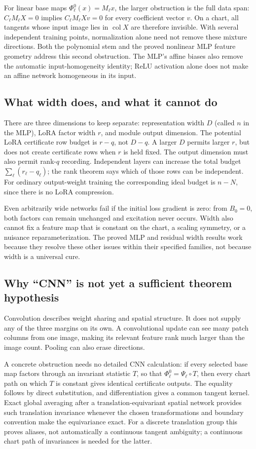 \documentclass[12pt,a4paper]{article}
\theoremstyle{readable}
\theoremstyle{definition}\newtheorem{example}[theorem]{Example}
\newcommand{\col}{\operatorname{col}}\newcommand{\row}{\operatorname{row}}
\begin{document}
For linear base maps \(\Phi_\ell^0(x)=M_\ell x\), the larger obstruction is the full data span: \(C_\ell M_\ell X=0\) implies \(C_\ell M_\ell Xv=0\) for every coefficient vector \(v\). On a chart, all tangents whose input image lies in \(\col X\) are therefore invisible. With several independent training points, normalization alone need not remove these mixture directions. Both the polynomial stem and the proved nonlinear MLP feature geometry address this second obstruction. The MLP's affine biases also remove the automatic input-homogeneity identity; ReLU activation alone does not make an affine network homogeneous in its input.

\subsection{What width does, and what it cannot do}
There are three dimensions to keep separate: representation width \(D\) (called \(n\) in the MLP), LoRA factor width \(r\), and module output dimension. The potential LoRA certificate row budget is \(r-q\), not \(D-q\). A larger \(D\) permits larger \(r\), but does not create certificate rows when \(r\) is held fixed. The output dimension must also permit rank-\(q\) recording. Independent layers can increase the total budget \(\sum_\ell(r_\ell-q_\ell)\); the rank theorem says which of those rows can be independent. For ordinary output-weight training the corresponding ideal budget is \(n-N\), since there is no LoRA compression.

Even arbitrarily wide networks fail if the initial loss gradient is zero: from \(B_0=0\), both factors can remain unchanged and excitation never occurs. Width also cannot fix a feature map that is constant on the chart, a scaling symmetry, or a nuisance reparameterization. The proved MLP and residual width results work because they resolve these other issues within their specified families, not because width is a universal cure.

\subsection{Why ``CNN'' is not yet a sufficient theorem hypothesis}
Convolution describes weight sharing and spatial structure. It does not supply any of the three margins on its own. A convolutional update can see many patch columns from one image, making its relevant feature rank much larger than the image count. Pooling can also erase directions.

A concrete obstruction needs no detailed CNN calculation: if every selected base map factors through an invariant statistic \(T\), so that \(\Phi_\ell^0=\Psi_\ell\circ T\), then every chart path on which \(T\) is constant gives identical certificate outputs. The equality follows by direct substitution, and differentiation gives a common tangent kernel. Exact global averaging after a translation-equivariant spatial network provides such translation invariance whenever the chosen transformations and boundary convention make the equivariance exact. For a discrete translation group this proves aliases, not automatically a continuous tangent ambiguity; a continuous chart path of invariances is needed for the latter.
\end{document}
